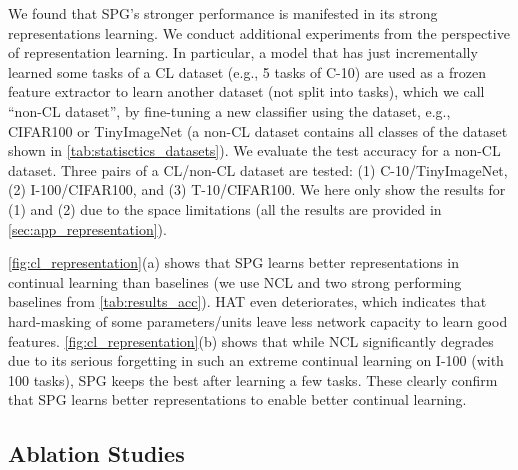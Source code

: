We found that SPG's stronger performance is manifested in its strong representations learning. 
We conduct additional experiments from the perspective of  representation learning.
In particular, a model that has just incrementally learned some tasks of a CL dataset (e.g., 5 tasks of C-10) are used as a frozen feature extractor to learn another dataset (not split into tasks), which we call ``non-CL dataset'', by fine-tuning a new classifier using the dataset, e.g., CIFAR100 or TinyImageNet (a non-CL dataset contains all classes of the dataset shown in \cref{tab:statisctics_datasets}). 
We evaluate the test accuracy for a non-CL dataset. Three pairs of a CL/non-CL dataset are tested: (1) C-10/TinyImageNet, (2) I-100/CIFAR100, and (3) T-10/CIFAR100. We here only show the results for (1) and (2) due to the space limitations (all the results are provided in \cref{sec:app_representation}).


\cref{fig:cl_representation}(a) shows that SPG learns better representations in continual learning than baselines (we use NCL and two strong performing baselines from \cref{tab:results_acc}). HAT even deteriorates, which indicates that hard-masking of some parameters/units leave less network capacity to learn good features. 
\cref{fig:cl_representation}(b) shows that while NCL significantly degrades due to its serious forgetting in such an extreme continual learning on I-100 (with 100 tasks), SPG keeps the best after learning a few tasks.
These clearly confirm that SPG learns better representations to enable better continual learning. 










\subsection{Ablation Studies} \label{sec:ablation}


